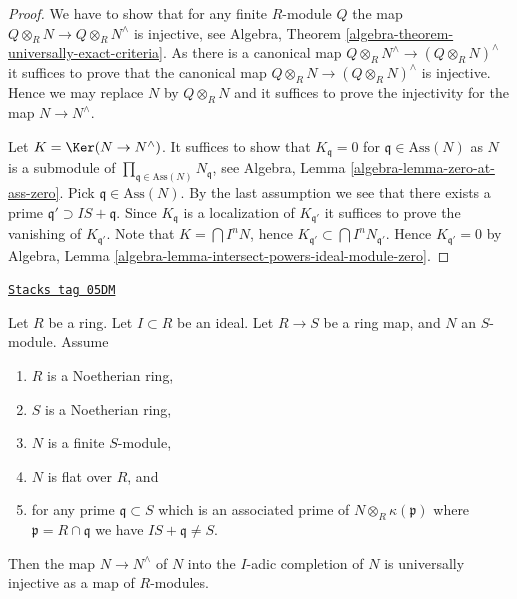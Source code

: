 \begin{proof}
We have to show that for any finite $R$-module $Q$ the map
$Q \otimes_R N \to Q \otimes_R N^\wedge$ is injective, see
Algebra, Theorem \ref{algebra-theorem-universally-exact-criteria}.
As there is a canonical map $Q \otimes_R N^\wedge \to (Q \otimes_R N)^\wedge$
it suffices to prove that the canonical map
$Q \otimes_R N \to (Q \otimes_R N)^\wedge$ is injective.
Hence we may replace $N$ by $Q \otimes_R N$ and it suffices to prove the
injectivity for the map $N \to N^\wedge$.

\medskip\noindent
Let $K = \Ker(N \to N^\wedge)$. It suffices to show that
$K_{\mathfrak q} = 0$ for $\mathfrak q \in \text{Ass}(N)$ as $N$ is a
submodule of $\prod_{\mathfrak q \in \text{Ass}(N)} N_{\mathfrak q}$, see
Algebra, Lemma \ref{algebra-lemma-zero-at-ass-zero}.
Pick $\mathfrak q \in \text{Ass}(N)$. By the last assumption we see that
there exists a prime $\mathfrak q' \supset IS + \mathfrak q$.
Since $K_{\mathfrak q}$ is a localization of $K_{\mathfrak q'}$
it suffices to prove the vanishing of $K_{\mathfrak q'}$.
Note that $K = \bigcap I^nN$, hence
$K_{\mathfrak q'} \subset \bigcap I^nN_{\mathfrak q'}$.
Hence $K_{\mathfrak q'} = 0$ by
Algebra, Lemma \ref{algebra-lemma-intersect-powers-ideal-module-zero}.
\end{proof}

\begin{lemma}
\label{flat-lemma-universally-injective-to-completion-flat}
\href{https://stacks.math.columbia.edu/tag/05DM}{\texttt{Stacks tag 05DM}}

Let $R$ be a ring.
Let $I \subset R$ be an ideal.
Let $R \to S$ be a ring map, and $N$ an $S$-module.
Assume
\begin{enumerate}
\item $R$ is a Noetherian ring,
\item $S$ is a Noetherian ring,
\item $N$ is a finite $S$-module,
\item $N$ is flat over $R$, and
\item for any prime $\mathfrak q \subset S$ which is an associated prime of
$N \otimes_R \kappa(\mathfrak p)$ where $\mathfrak p = R \cap \mathfrak q$
we have $IS + \mathfrak q \not = S$.
\end{enumerate}
Then the map $N \to N^\wedge$ of $N$ into the $I$-adic completion of $N$
is universally injective as a map of $R$-modules.
\end{lemma}

